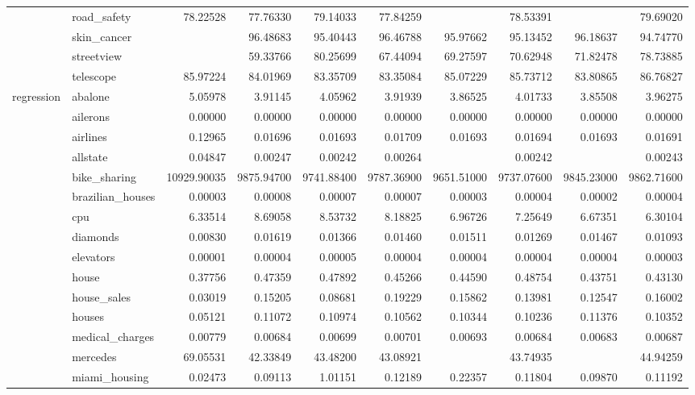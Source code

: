 \begin{tabular}{llrrrrrrrr}
 & road_safety & 78.22528 & 77.76330 & 79.14033 & 77.84259 &  & 78.53391 &  & 79.69020 \\
 & skin_cancer &  & 96.48683 & 95.40443 & 96.46788 & 95.97662 & 95.13452 & 96.18637 & 94.74770 \\
 & streetview &  & 59.33766 & 80.25699 & 67.44094 & 69.27597 & 70.62948 & 71.82478 & 78.73885 \\
 & telescope & 85.97224 & 84.01969 & 83.35709 & 83.35084 & 85.07229 & 85.73712 & 83.80865 & 86.76827 \\
\multirow[c]{27}{*}{regression} & abalone & 5.05978 & 3.91145 & 4.05962 & 3.91939 & 3.86525 & 4.01733 & 3.85508 & 3.96275 \\
 & ailerons & 0.00000 & 0.00000 & 0.00000 & 0.00000 & 0.00000 & 0.00000 & 0.00000 & 0.00000 \\
 & airlines & 0.12965 & 0.01696 & 0.01693 & 0.01709 & 0.01693 & 0.01694 & 0.01693 & 0.01691 \\
 & allstate & 0.04847 & 0.00247 & 0.00242 & 0.00264 &  & 0.00242 &  & 0.00243 \\
 & bike_sharing & 10929.90035 & 9875.94700 & 9741.88400 & 9787.36900 & 9651.51000 & 9737.07600 & 9845.23000 & 9862.71600 \\
 & brazilian_houses & 0.00003 & 0.00008 & 0.00007 & 0.00007 & 0.00003 & 0.00004 & 0.00002 & 0.00004 \\
 & cpu & 6.33514 & 8.69058 & 8.53732 & 8.18825 & 6.96726 & 7.25649 & 6.67351 & 6.30104 \\
 & diamonds & 0.00830 & 0.01619 & 0.01366 & 0.01460 & 0.01511 & 0.01269 & 0.01467 & 0.01093 \\
 & elevators & 0.00001 & 0.00004 & 0.00005 & 0.00004 & 0.00004 & 0.00004 & 0.00004 & 0.00003 \\
 & house & 0.37756 & 0.47359 & 0.47892 & 0.45266 & 0.44590 & 0.48754 & 0.43751 & 0.43130 \\
 & house_sales & 0.03019 & 0.15205 & 0.08681 & 0.19229 & 0.15862 & 0.13981 & 0.12547 & 0.16002 \\
 & houses & 0.05121 & 0.11072 & 0.10974 & 0.10562 & 0.10344 & 0.10236 & 0.11376 & 0.10352 \\
 & medical_charges & 0.00779 & 0.00684 & 0.00699 & 0.00701 & 0.00693 & 0.00684 & 0.00683 & 0.00687 \\
 & mercedes & 69.05531 & 42.33849 & 43.48200 & 43.08921 &  & 43.74935 &  & 44.94259 \\
 & miami_housing & 0.02473 & 0.09113 & 1.01151 & 0.12189 & 0.22357 & 0.11804 & 0.09870 & 0.11192 \\

\end{tabular}
